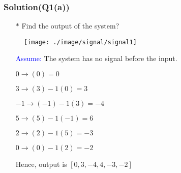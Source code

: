 \documentclass{beamer}
\newcommand{\blue}[1]{\textcolor{blue}{#1}}
\begin{document}
\begin{frame}
\frametitle{Solution(Q1(a))}

\begin{itemize} \itemsep1pt \parskip0pt 
  \item[$\ast$] Find the output of the system?
\end{itemize}

\begin{figure}[H]
  \centering
  \texttt{[image: ./image/signal/signal1]}
\end{figure}

\begin{itemize} \itemsep1pt \parskip0pt 
  \item[] \blue{Assume:} The system has no signal before the input.
  \item[] \hspace{9 mm}$0 \rightarrow $\hspace{5 mm}$(0) $\hspace{20 mm}$= 0$
  \item[] \hspace{9 mm}$3 \rightarrow $\hspace{5 mm}$(3) - 1(0) $\hspace{8.5 mm}$= 3$
  \item[] \hspace{6 mm}$-1 \rightarrow $\hspace{2 mm}$(-1) - 1(3) $\hspace{8.5 mm}$= -4$
  \item[] \hspace{9 mm}$5 \rightarrow $\hspace{5 mm}$(5) - 1(-1) $\hspace{5.5 mm}$= 6$
  \item[] \hspace{9 mm}$2 \rightarrow $\hspace{5 mm}$(2) - 1(5) $\hspace{8.5 mm}$= -3$
  \item[] \hspace{9 mm}$0 \rightarrow $\hspace{5 mm}$(0) - 1(2) $\hspace{8.5 mm}$= -2$
  \item[] Hence, output is $[0,3,-4,4,-3,-2]$
\end{itemize}


\end{frame}

\end{document}
